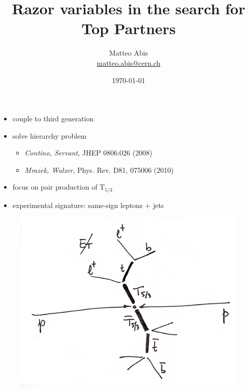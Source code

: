 \documentclass[ukenglish]{beamer}
\title[Razor for Top Partners]{Razor variables in the search for Top
Partners}
\author{Matteo Abis\\
\url{matteo.abis@cern.ch}}
\institute{Università di Padova and INFN}
\date{\today}
\begin{document}
\begingroup
{}
\begin{frame}
  \titlepage
\end{frame}
\endgroup
 
\begin{frame}
    \begin{itemize}
        \item couple to third generation
        \item solve hierarchy problem
            \begin{itemize}
                \item \emph{Contino, Servant}, JHEP 0806:026 (2008)
                \item \emph{Mrazek, Wulzer}, Phys. Rev. D81, 075006 (2010)
            \end{itemize}
        \item focus on pair production of $\mathrm{T}_{5/3}$
        \item experimental signature: same-sign leptons + jets
    \end{itemize}
    \begin{figure}[h]
        \centering
        \includegraphics[height=.5\textheight]{toppartner_decay_top.eps}
    \end{figure}
\end{frame}
\end{document}
